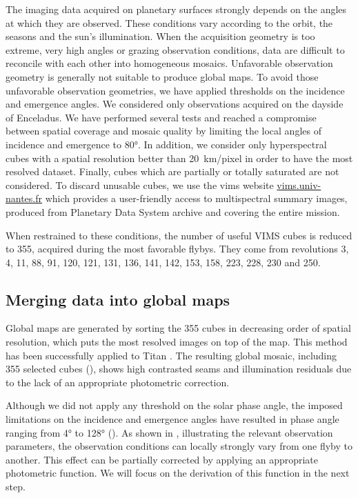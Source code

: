 \documentclass{arxiv-icarus}
\begin{document}
The imaging data acquired on planetary surfaces strongly depends on the angles at which they are observed. These conditions vary according to the orbit, the seasons and the sun's illumination. When the acquisition geometry is too extreme, \eg very high angles or grazing observation conditions, data are difficult to reconcile with each other into homogeneous mosaics. Unfavorable observation geometry is generally not suitable to produce global maps. To avoid those unfavorable observation geometries, we have applied thresholds on the incidence and emergence angles. We considered only observations acquired on the dayside of Enceladus. We have performed several tests and reached a compromise between spatial coverage and mosaic quality by limiting the local angles of incidence and emergence to \ang{80}. In addition, we consider only hyperspectral cubes with a spatial resolution better than \SI{20}{km/pixel} in order to have the most resolved dataset. Finally, cubes which are partially or totally saturated are not considered. To discard unusable cubes, we use the vims website \href{https://vims.univ-nantes.fr}{vims.univ-nantes.fr} which provides a user-friendly access to multispectral summary images, produced from Planetary Data System archive and covering the entire mission.

When restrained to these conditions, the number of useful VIMS cubes is reduced to 355, acquired during the most favorable flybys. They come from revolutions 3, 4, 11, 88, 91, 120, 121, 131, 136, 141, 142, 153, 158, 223, 228, 230 and 250.


\subsection{Merging data into global maps}

Global maps are generated by sorting the 355 cubes in decreasing order of spatial resolution, which puts the most resolved images on top of the map. This method has been successfully applied to Titan \citep{LeMouelic2019}. The resulting global mosaic, including 355 selected cubes (), shows high contrasted seams and illumination residuals due to the lack of an appropriate photometric correction.


Although we did not apply any threshold on the solar phase angle, the imposed limitations on the incidence and emergence angles have resulted in phase angle ranging from \ang{4} to \ang{128} (). As shown in , illustrating the relevant observation parameters, the observation conditions can locally strongly vary from one flyby to another. This effect can be partially corrected by applying an appropriate photometric function. We will focus on the derivation of this function in the next step.
\end{document}
